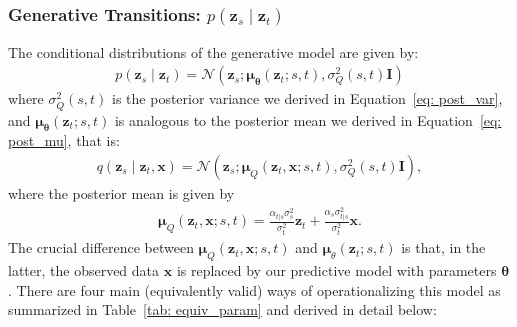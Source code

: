 \subsubsection{Generative Transitions: $p(\mathbf{z}_s \mid \mathbf{z}_t)$}
\label{subsubsec: Deriving p}
%
The conditional distributions of the generative model are given by:
%
\begin{align}
    p(\mathbf{z}_s \mid \mathbf{z}_t) = 
    \mathcal{N}\left(\mathbf{z}_s; \boldsymbol{\mu}_{\boldsymbol{\theta}}(\mathbf{z}_t; s, t), \sigma_Q^2(s,t)\mathbf{I} \right)
\end{align}
%
where $\sigma_Q^2(s,t)$ is the posterior variance we derived in Equation~\ref{eq: post_var}, and $\boldsymbol{\mu}_{\boldsymbol{\theta}}(\mathbf{z}_t; s, t)$ is analogous to the posterior mean we derived in Equation~\ref{eq: post_mu}, that is: 
%
\begin{align}
    q(\mathbf{z}_s \mid \mathbf{z}_t, \mathbf{x}) = \mathcal{N} \left(\mathbf{z}_s;\boldsymbol{\mu}_Q(\mathbf{z}_t, \mathbf{x};s,t), \sigma^2_Q(s,t) \mathbf{I}\right),
\end{align}
%
where the posterior mean is given by
%
\begin{align}
    \boldsymbol{\mu}_Q(\mathbf{z}_t, \mathbf{x};s,t) = \frac{\alpha_{t|s}\sigma_s^2}{\sigma^2_{t}}\mathbf{z}_t + \frac{\alpha_s \sigma^2_{t|s}}{\sigma_{t}^2}\mathbf{x}.
\end{align}
%
The crucial difference between $\boldsymbol{\mu}_Q(\mathbf{z}_t, \mathbf{x};s,t)$ and $\boldsymbol{\mu}_\theta(\mathbf{z}_t; s, t)$ is that, in the latter, the observed data $\mathbf{x}$ is replaced by our predictive model with parameters $\boldsymbol{\theta}$. There are four main (equivalently valid) ways of operationalizing this model as summarized in Table~\ref{tab: equiv_param} and derived in detail below:
